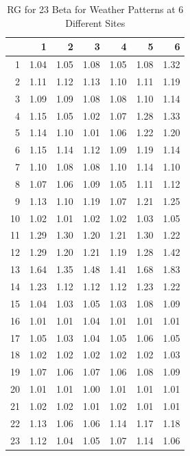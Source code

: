 \documentclass[12pt]{article}
\begin{document}


\iffalse

\begin{table}[ht]\caption{RG for 23 Beta for Weather Patterns at 6 Different Sites}
\centering
\begin{tabular}{rrrrrrr}
  \hline
 & 1 & 2 & 3 & 4 & 5 & 6 \\ 
  \hline
1 & 1.04 & 1.05 & 1.08 & 1.05 & 1.08 & 1.32 \\ 
  2 & 1.11 & 1.12 & 1.13 & 1.10 & 1.11 & 1.19 \\ 
  3 & 1.09 & 1.09 & 1.08 & 1.08 & 1.10 & 1.14 \\ 
  4 & 1.15 & 1.05 & 1.02 & 1.07 & 1.28 & 1.33 \\ 
  5 & 1.14 & 1.10 & 1.01 & 1.06 & 1.22 & 1.20 \\ 
  6 & 1.15 & 1.14 & 1.12 & 1.09 & 1.19 & 1.14 \\ 
  7 & 1.10 & 1.08 & 1.08 & 1.10 & 1.14 & 1.10 \\ 
  8 & 1.07 & 1.06 & 1.09 & 1.05 & 1.11 & 1.12 \\ 
  9 & 1.13 & 1.10 & 1.19 & 1.07 & 1.21 & 1.25 \\ 
  10 & 1.02 & 1.01 & 1.02 & 1.02 & 1.03 & 1.05 \\ 
  11 & 1.29 & 1.30 & 1.20 & 1.21 & 1.30 & 1.22 \\ 
  12 & 1.29 & 1.20 & 1.21 & 1.19 & 1.28 & 1.42 \\ 
  13 & 1.64 & 1.35 & 1.48 & 1.41 & 1.68 & 1.83 \\ 
  14 & 1.23 & 1.12 & 1.12 & 1.12 & 1.23 & 1.22 \\ 
  15 & 1.04 & 1.03 & 1.05 & 1.03 & 1.08 & 1.09 \\ 
  16 & 1.01 & 1.01 & 1.04 & 1.01 & 1.01 & 1.01 \\ 
  17 & 1.05 & 1.03 & 1.04 & 1.05 & 1.06 & 1.05 \\ 
  18 & 1.02 & 1.02 & 1.02 & 1.02 & 1.02 & 1.03 \\ 
  19 & 1.07 & 1.06 & 1.07 & 1.06 & 1.08 & 1.09 \\ 
  20 & 1.01 & 1.01 & 1.00 & 1.01 & 1.01 & 1.01 \\ 
  21 & 1.02 & 1.02 & 1.01 & 1.02 & 1.01 & 1.01 \\ 
  22 & 1.13 & 1.06 & 1.06 & 1.14 & 1.17 & 1.18 \\ 
  23 & 1.12 & 1.04 & 1.05 & 1.07 & 1.14 & 1.06 \\ 
   \hline
\end{tabular}
\end{table}
\end{document}
